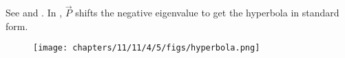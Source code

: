 See 
and 
.
In
, $\vec{P}$ shifts the negative eigenvalue 
to get the hyperbola in standard form.
\begin{figure}[H]
	\begin{center} 
	    \texttt{[image: chapters/11/11/4/5/figs/hyperbola.png]}
	\end{center}
\caption{}
\label{fig:chapters/11/11/4/5/1}
\end{figure}

